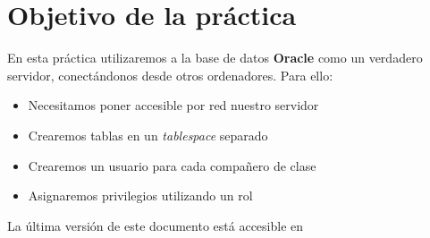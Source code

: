 
\usepackage{eurosym}





\renewcommand{\hmwkTitle}{Usuarios y permisos}
\renewcommand{\hmwkClass}{ASGBD}

\usepackage{blindtext}






\primerapagina

\section{Objetivo de la práctica}
En esta práctica utilizaremos a la base de datos \textbf{Oracle} como un verdadero servidor, conectándonos desde otros ordenadores. Para ello:
\begin{itemize}
\item Necesitamos poner accesible por red nuestro servidor
\item Crearemos tablas en un \textit{tablespace} separado
\item Crearemos un usuario para cada compañero de clase
\item Asignaremos privilegios utilizando un rol
\end{itemize}

La última versión de este documento está accesible en 

